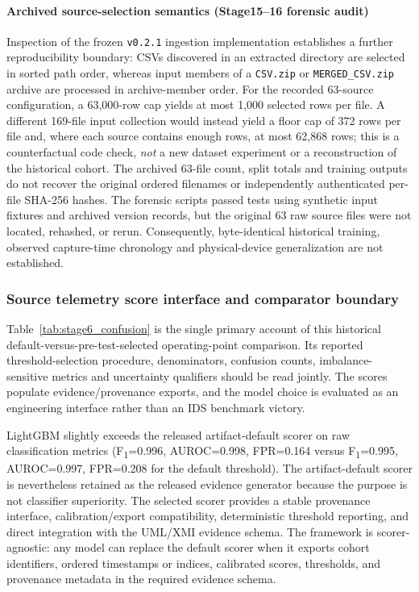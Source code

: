\documentclass[12pt,a4paper]{article}
\begin{document}
\paragraph{Archived source-selection semantics (Stage15--16 forensic audit)}
Inspection of the frozen \texttt{v0.2.1} ingestion implementation establishes a further reproducibility boundary: CSVs discovered in an extracted directory are selected in sorted path order, whereas input members of a \texttt{CSV.zip} or \texttt{MERGED\_CSV.zip} archive are processed in archive-member order. For the recorded 63-source configuration, a 63,000-row cap yields at most 1,000 selected rows per file. A different 169-file input collection would instead yield a floor cap of 372 rows per file and, where each source contains enough rows, at most 62,868 rows; this is a counterfactual code check, \emph{not} a new dataset experiment or a reconstruction of the historical cohort. The archived 63-file count, split totals and training outputs do not recover the original ordered filenames or independently authenticated per-file SHA-256 hashes. The forensic scripts passed tests using synthetic input fixtures and archived version records, but the original 63 raw source files were not located, rehashed, or rerun. Consequently, byte-identical historical training, observed capture-time chronology and physical-device generalization are not established.

\subsubsection{Source telemetry score interface and comparator boundary}
\label{sec:supporting-demo}
Table~\ref{tab:stage6_confusion} is the single primary account of this historical default-versus-pre-test-selected operating-point comparison. Its reported threshold-selection procedure, denominators, confusion counts, imbalance-sensitive metrics and uncertainty qualifiers should be read jointly. The scores populate evidence/provenance exports, and the model choice is evaluated as an engineering interface rather than an IDS benchmark victory.

LightGBM slightly exceeds the released artifact-default scorer on raw classification metrics (F\textsubscript{1}=0.996, AUROC=0.998, FPR=0.164 versus F\textsubscript{1}=0.995, AUROC=0.997, FPR=0.208 for the default threshold). The artifact-default scorer is nevertheless retained as the released evidence generator because the purpose is not classifier superiority. The selected scorer provides a stable provenance interface, calibration/export compatibility, deterministic threshold reporting, and direct integration with the UML/XMI evidence schema. The framework is scorer-agnostic: any model can replace the default scorer when it exports cohort identifiers, ordered timestamps or indices, calibrated scores, thresholds, and provenance metadata in the required evidence schema.
\end{document}
